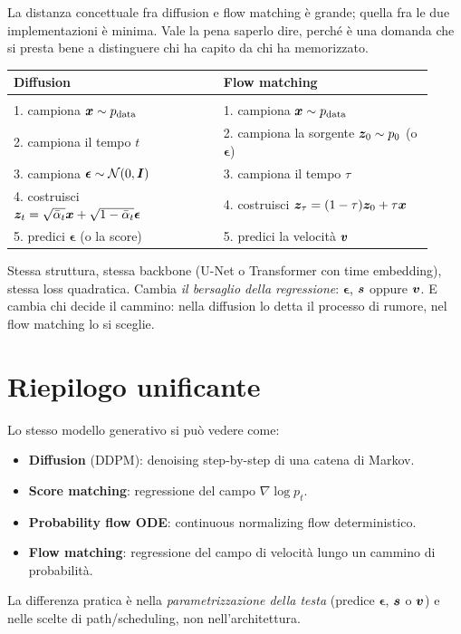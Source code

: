 \begin{tcolorbox}[mybox, title={Le due ricette di training, affiancate}]
La distanza concettuale fra diffusion e flow matching è grande; quella fra le due implementazioni è minima. Vale la pena saperlo dire, perché è una domanda che si presta bene a distinguere chi ha capito da chi ha memorizzato.

\medskip
\begin{tabularx}{\linewidth}{@{}p{0.46\linewidth}p{0.46\linewidth}@{}}
\textbf{Diffusion} & \textbf{Flow matching} \\[2pt]
\hline\\[-6pt]
1. campiona $\bm{x} \sim p_{\text{data}}$ & 1. campiona $\bm{x} \sim p_{\text{data}}$ \\
2. campiona il tempo $t$ & 2. campiona la sorgente $\bm{z}_0 \sim p_0$ (o $\boldsymbol{\epsilon}$) \\
3. campiona $\boldsymbol{\epsilon} \sim \mathcal{N}(0,\bm{I})$ & 3. campiona il tempo $\tau$ \\
4. costruisci $\bm{z}_t = \sqrt{\bar\alpha_t}\bm{x} + \sqrt{1-\bar\alpha_t}\boldsymbol{\epsilon}$ & 4. costruisci $\bm{z}_\tau = (1-\tau)\bm{z}_0 + \tau\bm{x}$ \\
5. predici $\boldsymbol{\epsilon}$ (o la score) & 5. predici la velocità $\bm{v}$ \\
\end{tabularx}

\medskip
Stessa struttura, stessa backbone (U-Net o Transformer con time embedding), stessa loss quadratica. Cambia \emph{il bersaglio della regressione}: $\boldsymbol{\epsilon}$, $\bm{s}$ oppure $\bm{v}$. E cambia chi decide il cammino: nella diffusion lo detta il processo di rumore, nel flow matching lo si sceglie.
\end{tcolorbox}

\section{Riepilogo unificante}

\begin{tcolorbox}[mybox, title={Quattro lenti sullo stesso oggetto}]
Lo stesso modello generativo si può vedere come:
\begin{itemize}
  \item \textbf{Diffusion} (DDPM): denoising step-by-step di una catena di Markov.
  \item \textbf{Score matching}: regressione del campo $\nabla\log p_t$.
  \item \textbf{Probability flow ODE}: continuous normalizing flow deterministico.
  \item \textbf{Flow matching}: regressione del campo di velocità lungo un cammino di probabilità.
\end{itemize}
La differenza pratica è nella \emph{parametrizzazione della testa} (predice $\boldsymbol{\epsilon}$, $\bm{s}$ o $\bm{v}$) e nelle scelte di path/scheduling, non nell'architettura.
\end{tcolorbox}

